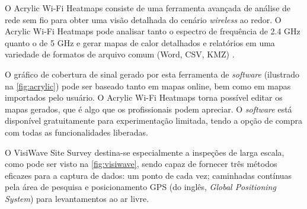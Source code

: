 \label{subsubsubsec:acrylic-wifi-heatmaps}

O Acrylic Wi-Fi Heatmaps consiste de uma ferramenta avançada de análise de rede sem fio para obter uma visão detalhada do cenário \textit{wireless} ao redor. O Acrylic Wi-Fi Heatmaps pode analisar tanto o espectro de frequência de 2.4 GHz quanto o de 5 GHz e gerar mapas de calor detalhados e relatórios em uma variedade de formatos de arquivo comum (Word, CSV, KMZ) \cite{Netspot2019}. 

O gráfico de cobertura  de sinal gerado por esta ferramenta de \textit{software} (ilustrado na \autoref{fig:acrylic}) pode ser baseado tanto em mapas online, bem como em mapas importados pelo usuário. O Acrylic Wi-Fi Heatmaps torna possível editar os mapas gerados, que é algo que os profissionais podem apreciar. O \textit{software} está disponível gratuitamente para experimentação limitada, tendo a opção de compra com todas as funcionalidades liberadas.

\begin{figure}[H]
	\centering
\end{figure}

\label{subsubsubsec:visiwave}

O VisiWave Site Survey destina-se especialmente a inspeções de larga escala, como pode ser visto na \autoref{fig:visiwave}, sendo capaz de fornecer três métodos eficazes para a captura de dados: um ponto de cada vez; caminhadas contínuas pela área de pesquisa e posicionamento GPS (do inglês, \textit{Global Positioning System}) para levantamentos ao ar livre. 

